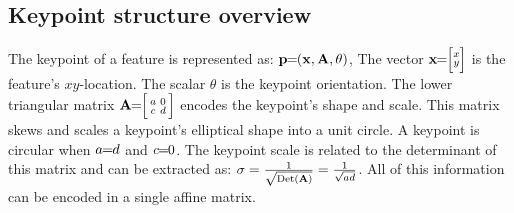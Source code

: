         \SceneryMatch{}

        \genfeatweight{}

    \subsection{Keypoint structure overview}\label{sec:kpstructure}
        The keypoint of a feature is represented as:
        $\mathbf{p}\mkern-6mu=\mkern-6mu(\mathbf{x}, \mathbf{A}, \theta)$, %
        The vector $\mathbf{x}\mkern-6mu=\mkern-6mu \Bigl[\negthinspace \begin{smallmatrix}  x\\ y \end{smallmatrix} \negthinspace \Bigr] $ is the feature's
          $xy$-location.
        The scalar $\theta$ is the keypoint orientation.
        The lower triangular matrix $\mathbf{A}\mkern-6mu=\mkern-6mu \Bigl[ \begin{smallmatrix} a & 0\\c & d \end{smallmatrix} \Bigr] $ encodes the
          keypoint's shape and scale.
        This matrix skews and scales a keypoint's elliptical shape into
          a unit circle.
        A keypoint is circular when $a\mkern-6mu=\mkern-6mu{}d$ and $c\mkern-6mu=\mkern-6mu0$.
        The keypoint scale is related to the determinant of this matrix
          and can be extracted as: %
        $\sigma = \frac{1}{\sqrt{\mathbin{\textrm{Det}}\left(\mathbf{A}\right)}} =
          \frac{1}{\sqrt{ad}}$.
        All of this information can be encoded in a single affine
          matrix.


